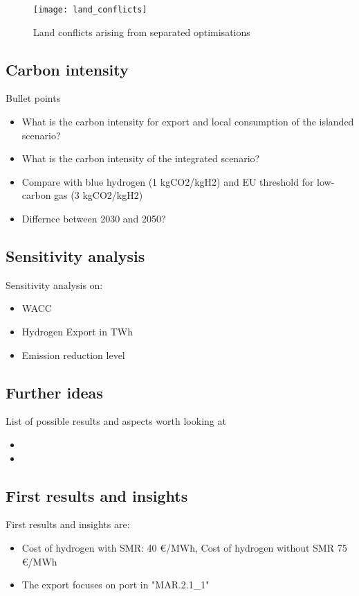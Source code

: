 \begin{figure}[h!]
    \centering
    \texttt{[image: land\_conflicts]}
    \caption{Land conflicts arising from separated optimisations}
    \label{fig:land_conflicts}
\end{figure}


\subsection{Carbon intensity}
Bullet points
\begin{itemize}
    \item What is the carbon intensity for export and local consumption of the islanded scenario? 
    \item What is the carbon intensity of the integrated scenario?
    \item Compare with blue hydrogen (1 kgCO2/kgH2) and EU threshold for low-carbon gas (3 kgCO2/kgH2)
    \item Differnce between 2030 and 2050?
\end{itemize}



\subsection{Sensitivity analysis}
Sensitivity analysis on:
\begin{itemize}
    \item WACC
    \item Hydrogen Export in TWh
    \item Emission reduction level
\end{itemize}


\subsection{Further ideas}
List of possible results and aspects worth looking at
\begin{itemize}
    \item 
    \item 
\end{itemize}


\subsection{First results and insights}

First results and insights are:
\begin{itemize}
    \item Cost of hydrogen with SMR: 40 €/MWh, Cost of hydrogen without SMR 75 €/MWh
    \item The export focuses on port in "MAR.2.1{\_}1"
\end{itemize}


